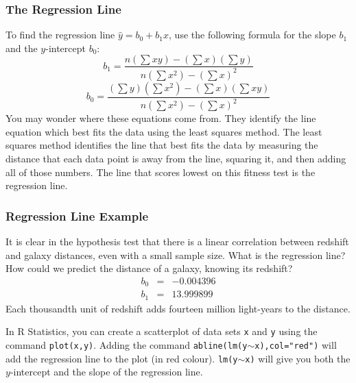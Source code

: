 \documentclass[xcolor=dvipsnames]{beamer}
\begin{document}
\begin{frame}
  \frametitle{The Regression Line}
  To find the regression line $\hat{y}=b_{0}+b_{1}x$, use the
  following formula for the slope $b_{1}$ and the $y$-intercept
  $b_{0}$:
  \begin{equation}
    \label{eq:ohzashur}
    b_{1}=\frac{n\left(\sum{}xy\right)-\left(\sum{}x\right)\left(\sum{}y\right)}{n\left(\sum{}x^{2}\right)-\left(\sum{}x\right)^{2}}
  \end{equation}
  \begin{equation}
    \label{eq:xuothaba}
    b_{0}=\frac{\left(\sum{}y\right)\left(\sum{}x^{2}\right)-\left(\sum{}x\right)\left(\sum{}xy\right)}{n\left(\sum{}x^{2}\right)-\left(\sum{}x\right)^{2}}
  \end{equation}
 You may wonder where these equations come from. They identify the
 line equation which best fits the data using the \alert{least
   squares} method. The least squares method identifies the line
 that best fits the data by measuring the distance that each data
 point is away from the line, squaring it, and then adding all of
 those numbers. The line that scores lowest on this fitness test
 is the regression line.
\end{frame}

\begin{frame}
  \frametitle{Regression Line Example}
   It is clear in the hypothesis test
  that there is a linear correlation between redshift and galaxy
  distances, even with a small sample size. What is the regression
  line? How could we predict the distance of a galaxy, knowing its
  redshift?
  \begin{equation}
    \label{eq:ahnuwiez}
    \begin{array}{rcl}
      b_{0}&=&-0.004396 \\
      b_{1}&=&13.999899
    \end{array}
  \end{equation}
  Each thousandth unit of redshift adds fourteen million light-years to
  the distance.

  \bigskip

  In R Statistics, you can create a scatterplot of data sets
  \texttt{x} and \texttt{y} using the command \texttt{plot(x,y)}.
  Adding the command \texttt{abline(lm(y}$\sim$\texttt{x),col="red")} will add
  the regression line to the plot (in red colour).
  \texttt{lm(y}$\sim$\texttt{x)} will give you both the $y$-intercept and the
  slope of the regression line.
\end{frame}
\end{document}
